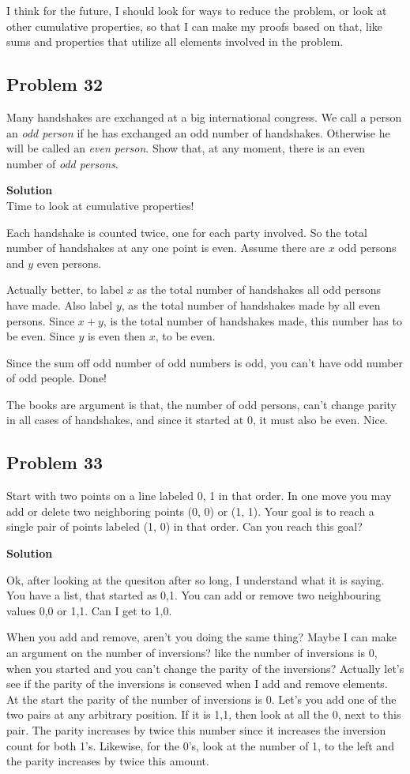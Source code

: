 \documentclass[12pt,tikz,border=10pt]{article}
\theoremstyle{definition}
\theoremstyle{remark}
\begin{document}
I think for the future, I should look for ways to reduce the problem, or look at other 
cumulative properties, so that I can make my proofs based on that, like sums and properties that utilize all elements 
involved in the problem.

\subsection{Problem 32}
Many handshakes are exchanged at a big international congress. We call a person
an \textit{odd person} if he has exchanged an odd number of handshakes. Otherwise he will
be called an \textit{even person}. Show that, at any moment, there is an even number of \textit{odd
persons}.

\textbf{Solution}\\
Time to look at cumulative properties!

Each handshake is counted twice, one for each party involved. So the total number of 
handshakes at any one point is even. Assume there are $x$ odd persons and $y$ even persons.

Actually better, to label $x$ as the total number of handshakes all odd persons have made. Also label $y$, as the total
number of handshakes made by all even persons. Since $x+y$, is the total number of 
handshakes made, this number has to be even. Since $y$ is even then $x$, to be even.

Since the sum off odd number of odd numbers is odd, you can't have odd number of odd people. Done!

The books are argument is that, the number of odd persons, can't change parity in all cases of handshakes, 
and since it started at 0, it must also be even. Nice.

\subsection{Problem 33}
Start with two points on a line labeled 0, 1 in that order. In one move you may add
or delete two neighboring points (0, 0) or (1, 1). Your goal is to reach a single pair
of points labeled (1, 0) in that order. Can you reach this goal?

\textbf{Solution}

Ok, after looking at the quesiton after so long, I understand what it is saying.
You have a list, that started as 0,1. You can add or remove two neighbouring values 0,0 or 1,1. 
Can I get to 1,0.

When you add and remove, aren't you doing the same thing? Maybe I can make an argument on
the number of inversions? like the number of inversions is 0, when you started and 
you can't change the parity of the inversions? Actually let's see if the parity of the 
inversions is conseved when I add and remove elements.\\
At the start the parity of the number of inversions is 0. Let's you add one of the two pairs
at any arbitrary position. If it is 1,1, then look at all the 0, next to this pair. The parity
increases by twice this number since it increases the inversion count for both 1's. Likewise, for
the 0's, look at the number of 1, to the left and the parity increases by twice this amount. 
\end{document}
